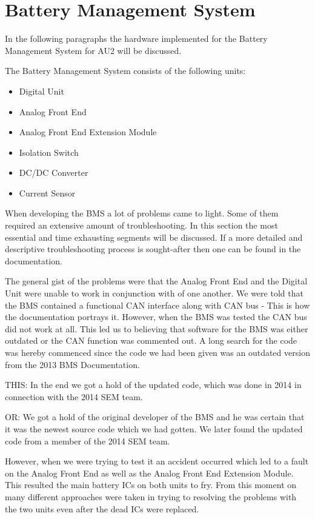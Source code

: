 \section{Battery Management System}
In the following paragraphs the hardware implemented for the Battery Management System for AU2 will be discussed. 

The Battery Management System consists of the following units:
\begin{itemize}
	\item{Digital Unit}
	\item{Analog Front End}
	\item{Analog Front End Extension Module}
	\item{Isolation Switch}
	\item{DC/DC Converter}
	\item{Current Sensor}
\end{itemize}

When developing the BMS a lot of problems came to light. Some of them required an extensive amount of troubleshooting. In this section the most essential and time exhausting segments will be discussed. If a more detailed and descriptive troubleshooting process is sought-after then one can be found in the documentation\cite{AU2}.

The general gist of the problems were that the Analog Front End and the Digital Unit were unable to work in conjunction with of one another. We  were told that the BMS contained a functional CAN interface along with CAN bus - This is how the documentation portrays it. However, when the BMS was tested the CAN bus did not work at all. This led us to believing that software for the BMS was either outdated or the CAN function was commented out. A long search for the code was hereby commenced since the code we had been given was an outdated version from the 2013 BMS Documentation\cite{BMSDocumentation}. 

THIS: In the end we got a hold of the updated code, which was done in 2014 in connection with the 2014 SEM team.

OR: We got a hold of the original developer of the BMS and he was certain that it was the newest source code which we had gotten. We later found the updated code from a member of the 2014 SEM team. 

However, when we were trying to test it an accident occurred which led to a fault on the Analog Front End as well as the Analog Front End Extension Module. This resulted the main battery ICs on both units to fry.
From this moment on many different approaches were taken in trying to resolving the problems with the two units even after the dead ICs were replaced. 

